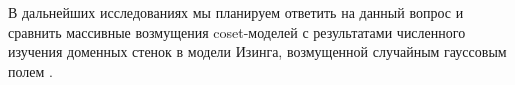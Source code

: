 В дальнейших исследованиях мы планируем ответить на данный вопрос и сравнить массивные возмущения coset-моделей с результатами численного изучения доменных стенок в модели Изинга, возмущенной случайным гауссовым полем \cite{stevenson2011domain}.


